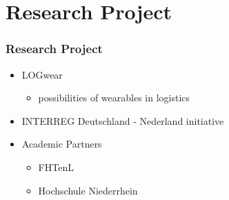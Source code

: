 \section{Research Project}
\begin{frame}\frametitle{Research Project}
	\begin{itemize}
		\item LOGwear
		\begin{itemize}
			\item possibilities of wearables in logistics
		\end{itemize}
		\item INTERREG Deutschland - Nederland initiative
		\item Academic Partners
		\begin{itemize}
			\item FHTenL
			\item Hochschule Niederrhein
		\end{itemize}
		
	\end{itemize}
\end{frame}